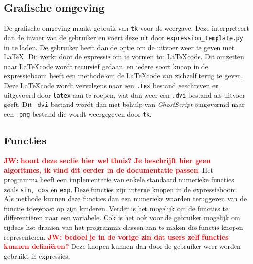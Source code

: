 \documentclass[a4paper]{article}
\newcommand{\rcom}[1]{\textbf{\textcolor{red}{#1}}}
\newcommand{\ttt}[1]{\texttt{#1}}
\begin{document}
\subsection{Grafische omgeving}
De grafische omgeving maakt gebruik van  \ttt{tk} voor de weergave. Deze interpreteert dan de invoer van de gebruiker en voert deze uit door \ttt{expression\_template.py} in te laden. De gebruiker heeft dan de optie om de uitvoer weer te geven met \LaTeX. Dit werkt door de expressie om te vormen tot \LaTeX code. Dit omzetten naar \LaTeX code wordt recursief gedaan, en iedere soort knoop in de expressieboom heeft een methode om de \LaTeX code van zichzelf terug te geven. Deze \LaTeX code wordt vervolgens naar een \ttt{.tex} bestand geschreven en uitgevoerd door \ttt{latex} aan te roepen, wat dan weer een \ttt{.dvi} bestand als uitvoer geeft. Dit \ttt{.dvi} bestand wordt dan met behulp van \textit{GhostScript} omgevormd naar een \ttt{.png} bestand die wordt weergegeven door \ttt{tk}. 

\subsection{Functies}\rcom{JW: hoort deze sectie hier wel thuis? Je beschrijft hier geen algoritmes, ik vind dit eerder in de documentatie passen.}
Het programma heeft een implementatie van enkele standaard numerieke functies zoals \ttt{sin, cos} en \ttt{exp}. Deze functies zijn interne knopen in de expressieboom. Als methode kunnen deze functies dan een numerieke waarden teruggeven van de functie toegepast op zijn kinderen. Verder is het mogelijk om de functies te differenti\"eren naar een variabele. Ook is het ook voor de gebruiker mogelijk om tijdens het draaien van het programma classen aan te maken die functie knopen representeren. \rcom{JW: bedoel je in de vorige zin dat users zelf functies kunnen defini\"eren?} Deze knopen kunnen dan door de gebruiker weer worden gebruikt in expressies.  
\end{document}
